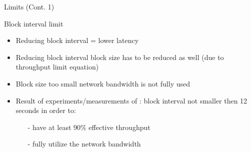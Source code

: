 \documentclass{beamer}
\begin{document}
  
  
  
  \begin{frame}{Limits (Cont. 1)}
      \begin{block}{Block interval limit}
        \begin{itemize}
            \item Reducing block interval = lower latency 
            \item Reducing block interval \MVRightarrow block size has to be reduced as well (due to throughput limit equation)
            \item Block size too small \MVRightarrow network bandwidth is not fully used
            \item Result of experiments/measurements of \cite{croman-scaling-blockchain}: block interval not smaller then 12 seconds in order to: 
            \begin{itemize}
                \item[-] have at least 90\% effective throughput
                \item[-] fully utilize the network bandwidth 
            \end{itemize}
        \end{itemize}
      \end{block}
  \end{frame}
 
 
 
 
 
\end{document}
